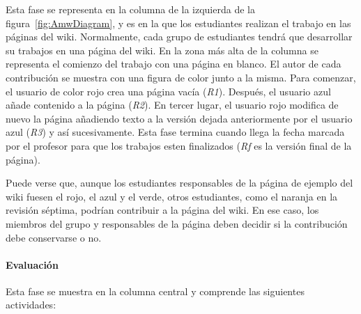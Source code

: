 Esta fase se representa en la columna de la izquierda de la figura~\ref{fig:AmwDiagram}, y es en la que los estudiantes realizan el trabajo en las páginas del wiki. Normalmente, cada grupo de estudiantes tendrá que desarrollar su trabajos en una página del wiki. En la zona más alta de la columna se representa el comienzo del trabajo con una página en blanco. El autor de cada contribución se muestra con una figura de color junto a la misma. Para comenzar, el usuario de color rojo crea una página vacía (\emph{R1}). Después, el usuario azul añade contenido a la página (\emph{R2}). En tercer lugar, el usuario rojo modifica de nuevo la página añadiendo texto a la versión dejada anteriormente por el usuario azul (\emph{R3}) y así sucesivamente. Esta fase termina cuando llega la fecha marcada por el profesor para que los trabajos esten finalizados (\emph{Rf} es la versión final de la página).

Puede verse que, aunque los estudiantes responsables de la página de ejemplo del wiki fuesen el rojo, el azul y el verde, otros estudiantes, como el naranja en la revisión séptima, podrían contribuir a la página del wiki. En ese caso, los miembros del grupo y responsables de la página deben decidir si la contribución debe conservarse o no.

\paragraph*{Evaluación}

Esta fase se muestra en la columna central y comprende las siguientes actividades:


